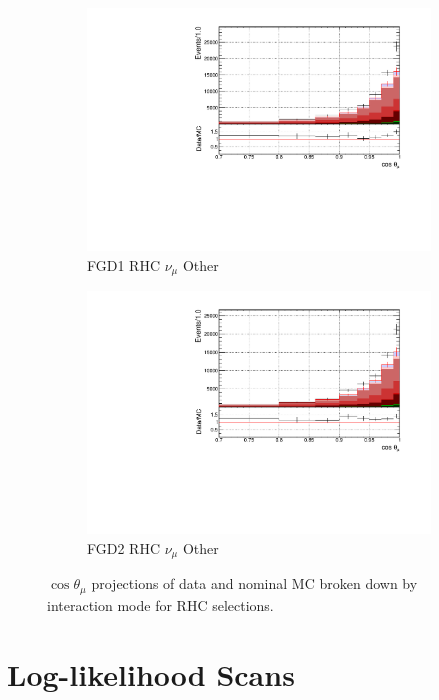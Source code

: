 \begin{figure}[!htbp]
\begin{subfigure}{0.49\textwidth}
  \centering
  \includegraphics[width=\textwidth]{figs/FGD1_NuMuBkg_CCOther_in_AntiNu_Mode_t}
  \caption{FGD1 RHC $\nu_{\mu}$ Other}
\end{subfigure}
\begin{subfigure}{0.49\textwidth}
  \centering
  \includegraphics[width=\textwidth]{figs/FGD2_NuMuBkg_CCOther_in_AntiNu_Mode_t}
  \caption{FGD2 RHC $\nu_{\mu}$ Other}
\end{subfigure}
\caption{$\cos\theta_{\mu}$ projections of data and nominal MC broken down by interaction mode for RHC \numu selections.}
\label{fig:tstack_rhc_numu}
\end{figure}

\FloatBarrier
\section{Log-likelihood Scans}\label{sec:llhscan}

